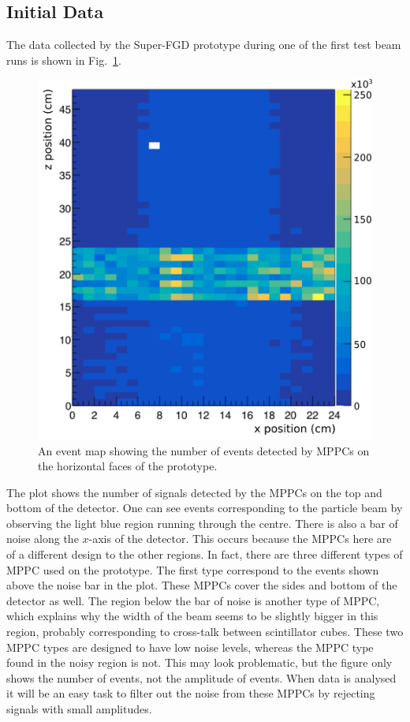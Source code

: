 \documentclass[aps,pra,12pt,notitlepage,tightenlines]{revtex4-1}
\begin{document}
\subsection{Initial Data}
The data collected by the Super-FGD prototype during one of the first test beam runs is shown in Fig.~\ref{fig:hit}.
\begin{figure}
 \includegraphics[scale=0.5]{hit_event2}
 \caption{An event map showing the number of events detected by MPPCs on the horizontal faces of the prototype.}
 \label{fig:hit}
\end{figure}
The plot shows the number of signals detected by the MPPCs on the top and bottom of the detector. One can see events corresponding to the particle beam by observing the light blue region running through the centre. There is also a bar of noise along the $x$-axis of the detector. This occurs because the MPPCs here are of a different design to the other regions. In fact, there are three different types of MPPC used on the prototype. The first type correspond to the events shown above the noise bar in the plot. These MPPCs cover the sides and bottom of the detector as well. The region below the bar of noise is another type of MPPC, which explains why the width of the beam seems to be slightly bigger in this region, probably corresponding to cross-talk between scintillator cubes. These two MPPC types are designed to have low noise levels, whereas the MPPC type found in the noisy region is not. This may look problematic, but the figure only shows the number of events, not the amplitude of events. When data is analysed it will be an easy task to filter out the noise from these MPPCs by rejecting signals with small amplitudes. 
\end{document}
